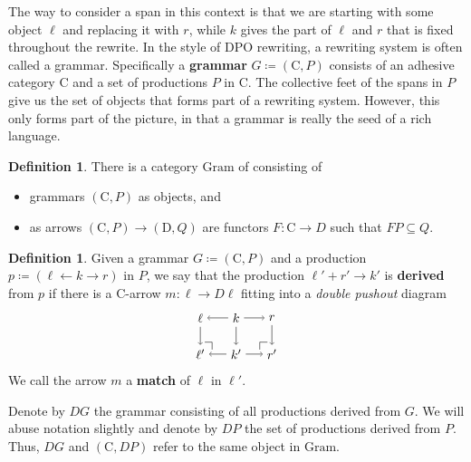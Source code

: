 \documentclass{amsart}
\newcommand{\C}{\cat{C}}
\newcommand{\D}{\cat{D}}
\newcommand{\Gram}{\cat{Gram}}
\newcommand{\defn}[1]{\textbf{#1}}
\newcommand{\cat}[1]{\mathrm{#1}}
\newcommand{\from}{\colon}
\newcommand{\spn}[3]{#1 + #3 \to #2}
\theoremstyle{remark}
\theoremstyle{definition}
\newtheorem{definition}[theorem]{Definition}
\begin{document}
The way to consider a span in this context is that we are starting
with some object $ \ell $ and replacing it with $ r $, while $ k $
gives the part of $ \ell $ and $ r $ that is fixed throughout the
rewrite.  In the style of DPO rewriting, a rewriting system is often
called a grammar. Specifically a \defn{grammar}
$ G \coloneqq ( \C , P ) $ consists of an adhesive category $ \C $ and
a set of productions $ P $ in $ \C $. The collective feet of the spans
in $ P $ give us the set of objects that forms part of a rewriting
system.  However, this only forms part of the picture, in that a
grammar is really the seed of a rich language.

\begin{definition}
  There is a category $ \Gram $ of consisting of
  \begin{itemize}
  \item grammars $ ( \C , P ) $ as objects, and
  \item as arrows $ ( \C , P ) \to ( \D , Q ) $ are functors $ F \from
    \C \to D $ such that $ FP \subseteq Q $.
  \end{itemize}
\end{definition}

\begin{definition}

  Given a grammar $ G \coloneqq ( \C , P ) $ and a production
  $ p \coloneqq ( \ell \gets k \to r ) $ in $ P $, we say that the
  production $ \spn{\ell'}{k'}{r'} $ is \defn{derived} from $ p $ if
  there is a $ \C $-arrow $ m \from \ell \to D\ell $ fitting into a
  \emph{double pushout} diagram %
  \[
    \begin{tikzpicture}
      \node (1) at (0,1) {\( \ell \)};
      \node (2) at (1,1) {\( k \)};
      \node (3) at (2,1) {\( r \)};
      \node (4) at (0,0) {\( \ell' \)};
      \node (5) at (1,0) {\( k' \)};
      \node (6) at (2,0) {\( r' \)};
      \draw [->] (2) to node [] {\scriptsize{\( \)}} (1);
      \draw [->] (2) to node [] {\scriptsize{\( \)}} (3);
      \draw [->] (5) to node [] {\scriptsize{\( \)}} (4);
      \draw [->] (5) to node [] {\scriptsize{\( \)}} (6);
      \draw [->] (1) to node [] {\scriptsize{\( \)}} (4);
      \draw [->] (2) to node [] {\scriptsize{\( \)}} (5);
      \draw [->] (3) to node [] {\scriptsize{\( \)}} (6);
      \node (a) at (0,0.33) {};
      \node (b) at (0.33,0.33) {};
      \node (c) at (0.33,0) {};
      \node (d) at (1.66,0) {};
      \node (e) at (1.66,0.33) {};
      \node (f) at (2,0.33) {};
      \draw (a) -- (b.center);
      \draw (b.center) -- (c);
      \draw (d) -- (e.center);
      \draw (e.center) -- (f);
    \end{tikzpicture}
  \]
  We call the arrow $ m $ a \defn{match} of $ \ell $ in $ \ell' $.
  
  Denote by $ DG $ the grammar consisting of all productions derived
  from $ G $. We will abuse notation slightly and denote by $ DP $ the
  set of productions derived from $ P $. Thus, $ DG $ and $ ( \C , DP
  ) $ refer to the same object in $ \Gram $.
  
\end{definition}
\end{document}
